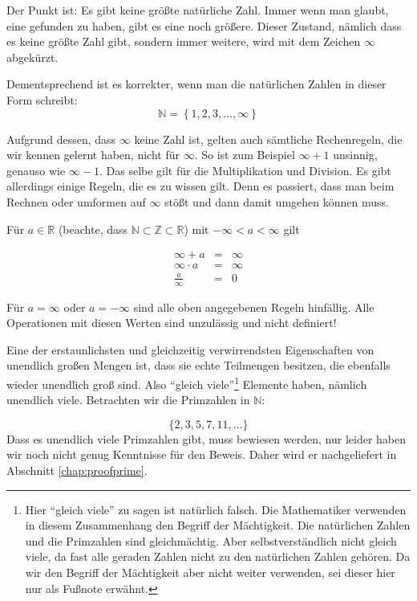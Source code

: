 Der Punkt ist: Es gibt keine größte natürliche Zahl. Immer wenn man glaubt, eine gefunden zu haben, gibt es eine noch größere. Dieser Zustand, nämlich dass es keine größte Zahl gibt, sondern immer weitere, wird mit dem Zeichen $\infty$ abgekürzt. 

Dementsprechend ist es korrekter, wenn man die natürlichen Zahlen in dieser Form schreibt:
\[
\mathbb{N} = \left\lbrace 1,2,3, \dots, \infty \right\rbrace
\]

Aufgrund dessen, dass $\infty$ keine Zahl ist, gelten auch sämtliche Rechenregeln, die wir kennen gelernt haben, nicht für $\infty$. So ist zum Beispiel $\infty +1$ unsinnig, genauso wie $\infty-1$. Das selbe gilt für die Multiplikation und Division. Es gibt allerdings einige Regeln, die es zu wissen gilt. Denn es passiert, dass man beim Rechnen oder umformen auf $\infty$ stößt und dann damit umgehen können muss. 

Für $a\in \mathbb{R}$ (beachte, dass $\mathbb{N} \subset \mathbb{Z} \subset \mathbb{R}$) mit $-\infty < a < \infty$ gilt

\begin{eqnarray*}
\infty + a &=& \infty \\
\infty \cdot a &=& \infty \\
\frac{a}{\infty} &=& 0
\end{eqnarray*}

Für $a=\infty$ oder $a=-\infty$ sind alle oben angegebenen Regeln hinfällig. Alle Operationen mit diesen Werten sind unzulässig und nicht definiert!

Eine der erstaunlichsten und gleichzeitig verwirrendsten Eigenschaften von unendlich großen Mengen ist, dass sie echte Teilmengen besitzen, die ebenfalls wieder unendlich groß sind. Also "`gleich viele"'\footnote{Hier "`gleich viele"' zu sagen ist natürlich falsch. Die Mathematiker verwenden in diesem Zusammenhang den Begriff der Mächtigkeit. Die natürlichen Zahlen und die Primzahlen sind gleichmächtig. Aber selbstverständlich nicht gleich viele, da fast alle geraden Zahlen nicht zu den natürlichen Zahlen gehören. Da wir den Begriff der Mächtigkeit aber nicht weiter verwenden, sei dieser hier nur als Fußnote erwähnt.} Elemente haben, nämlich unendlich viele. Betrachten wir die Primzahlen in $\mathbb{N}$:

\begin{equation*}
\lbrace 2,3,5,7,11, \dots \rbrace
\end{equation*}
Dass es unendlich viele Primzahlen gibt, muss bewiesen werden, nur leider haben wir noch nicht genug Kenntnisse für den Beweis. Daher wird er nachgeliefert in Abschnitt \ref{chap:proofprime}. 

